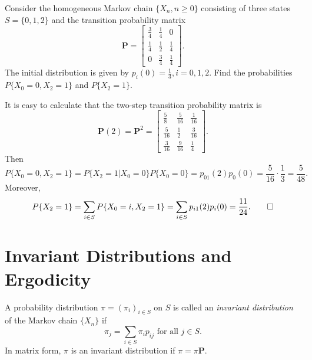 \begin{example}
  Consider the homogeneous Markov chain \(\{X_n, n \geq 0\}\) consisting of three states \(S = \{0, 1, 2\}\) and the transition probability matrix
  \[
    \mathbf{P} = \begin{bmatrix}
      \frac{3}{4} & \frac{1}{4} & 0 \\
      \frac{1}{4} & \frac{1}{2} & \frac{1}{4} \\
      0 & \frac{3}{4} & \frac{1}{4}
    \end{bmatrix}.
  \]
  The initial distribution is given by \(p_i(0) = \frac{1}{3}, i = 0, 1, 2\). Find the probabilities \(P\{X_0 = 0, X_2 = 1\}\) and \(P\{X_2 = 1\}\).
\end{example}
\begin{solution}
  It is easy to calculate that the two-step transition probability matrix is
  \[
    \mathbf{P}(2) = \mathbf{P}^2 = \begin{bmatrix}
      \frac{5}{8} & \frac{5}{16} & \frac{1}{16} \\
      \frac{5}{16} & \frac{1}{2} & \frac{3}{16} \\
      \frac{3}{16} & \frac{9}{16} & \frac{1}{4}
    \end{bmatrix}.
  \]
  Then
  \[
    P\{X_0 = 0, X_2 = 1\} = P\{X_2 = 1 | X_0 = 0\} P\{X_0 = 0\} = p_{01}(2) p_0(0) = \frac{5}{16} \cdot \frac{1}{3} = \frac{5}{48}.
  \]
  Moreover,
  \[
    P\{X_2 = 1\} = \sum_{i \in S} P\{X_0 = i, X_2 = 1\} = \sum_{i \in S} p_{i1}(2) p_i(0) = \frac{11}{24}. \qedhere
  \]
\end{solution}

\section{Invariant Distributions and Ergodicity}

\begin{definition}
  A probability distribution \(\pi = (\pi_i)_{i \in S}\) on \(S\) is called an \emph{invariant distribution} of the Markov chain \(\{X_n\}\) if
  \[
    \pi_j = \sum_{i \in S} \pi_i p_{ij} \text{ for all } j \in S.
  \]
  In matrix form, \(\pi\) is an invariant distribution if \(\pi = \pi \mathbf{P}\).
\end{definition}

